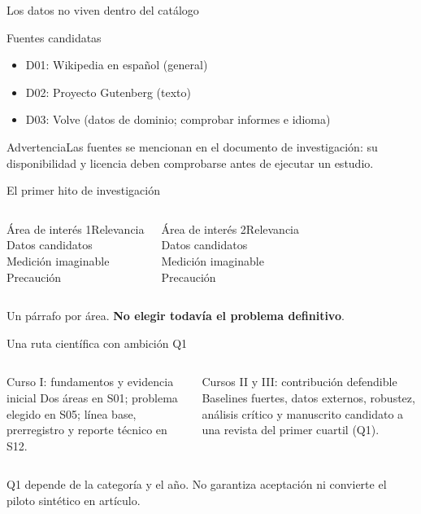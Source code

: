 \documentclass[aspectratio=169,10pt]{beamer}
\begin{document}
\begin{frame}{Los datos no viven dentro del catálogo}
\begin{block}{Fuentes candidatas}\begin{itemize}\item D01: Wikipedia en español (general)\item D02: Proyecto Gutenberg (texto)\item D03: Volve (datos de dominio; comprobar informes e idioma)\end{itemize}\end{block}
\begin{alertblock}{Advertencia}\centering Las fuentes se mencionan en el documento de investigación: su disponibilidad y licencia deben comprobarse antes de ejecutar un estudio.\end{alertblock}
\end{frame}

\begin{frame}{El primer hito de investigación}
\begin{columns}\begin{block}{Área de interés 1}\centering Relevancia\\Datos candidatos\\Medición imaginable\\Precaución\end{block}
\begin{block}{Área de interés 2}\centering Relevancia\\Datos candidatos\\Medición imaginable\\Precaución\end{block}\end{columns}
\vspace{5mm}\centering\large Un párrafo por área. \textbf{No elegir todavía el problema definitivo}.
\end{frame}

\begin{frame}{Una ruta científica con ambición Q1}
\begin{columns}[T]
\begin{block}{Curso I: fundamentos y evidencia inicial}
Dos áreas en S01; problema elegido en S05; línea base, prerregistro y reporte técnico en S12.
\end{block}
\begin{block}{Cursos II y III: contribución defendible}
Baselines fuertes, datos externos, robustez, análisis crítico y manuscrito candidato a una revista del primer cuartil (Q1).
\end{block}
\end{columns}
\vspace{3mm}\centering\small Q1 depende de la categoría y el año. No garantiza aceptación ni convierte el piloto sintético en artículo.
\end{frame}
\end{document}
